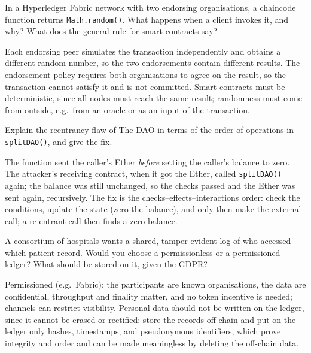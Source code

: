 \begin{exercise}
In a Hyperledger Fabric network with two endorsing organisations, a chaincode function returns \texttt{Math.random()}. What happens when a client invokes it, and why? What does the general rule for smart contracts say?
\end{exercise}
\begin{solution}
Each endorsing peer simulates the transaction independently and obtains a different random number, so the two endorsements contain different results. The endorsement policy requires both organisations to agree on the result, so the transaction cannot satisfy it and is not committed. Smart contracts must be deterministic, since all nodes must reach the same result; randomness must come from outside, e.g.\ from an oracle or as an input of the transaction.
\end{solution}

\begin{exercise}
Explain the reentrancy flaw of The DAO in terms of the order of operations in \texttt{splitDAO()}, and give the fix.
\end{exercise}
\begin{solution}
The function sent the caller's Ether \emph{before} setting the caller's balance to zero. The attacker's receiving contract, when it got the Ether, called \texttt{splitDAO()} again; the balance was still unchanged, so the checks passed and the Ether was sent again, recursively. The fix is the checks--effects--interactions order: check the conditions, update the state (zero the balance), and only then make the external call; a re-entrant call then finds a zero balance.
\end{solution}

\begin{exercise}
A consortium of hospitals wants a shared, tamper-evident log of who accessed which patient record. Would you choose a permissionless or a permissioned ledger? What should be stored on it, given the GDPR?
\end{exercise}
\begin{solution}
Permissioned (e.g.\ Fabric): the participants are known organisations, the data are confidential, throughput and finality matter, and no token incentive is needed; channels can restrict visibility. Personal data should not be written on the ledger, since it cannot be erased or rectified: store the records off-chain and put on the ledger only hashes, timestamps, and pseudonymous identifiers, which prove integrity and order and can be made meaningless by deleting the off-chain data.
\end{solution}
